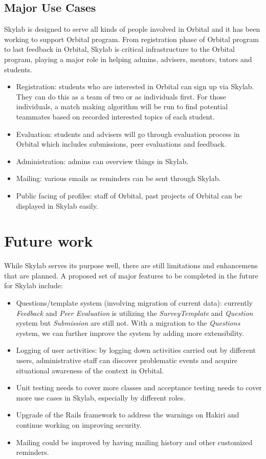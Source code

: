\subsection{Major Use Cases}

Skylab is designed to serve all kinds of people involved in Orbital and it has been working to support Orbital program. From registration phase of Orbital program to last feedback in Orbital, Skylab is critical infrastructure  to the Orbital program, playing a major role in helping admins, advisers, mentors, tutors and students.

\begin{itemize}
  \item Registration: students who are interested in Orbital can sign up via Skylab. They can do this as a team of two or as individuals first. For those individuals, a match making algorithm will be run to find potential teammates based on recorded interested topics of each student.
  \item Evaluation: students and advisers will go through evaluation process in Orbital which includes submissions, peer evaluations and feedback.
  \item Administration: admins can overview things in Skylab.
  \item Mailing: various emails as reminders can be sent through Skylab.
  \item Public facing of profiles: staff of Orbital, past projects of Orbital can be displayed in Skylab easily.
\end{itemize}

\section{Future work}

While Skylab serves its purpose well, there are still limitations and enhancemens that are planned.  A proposed set of major features to be completed in the future for Skylab include:

\begin{itemize}
  \item Questions/template system (involving migration of current data): currently \textit{Feedback} and \textit{Peer Evaluation} is utilizing the \textit{SurveyTemplate} and \textit{Question} system but \textit{Submission} are still not. With a migration to the \textit{Questions} system, we can further improve the system by adding more extensibility.
  \item Logging of user activities: by logging down activities carried out by different users, administrative staff can discover problematic events and acquire situational awareness of the context in Orbital.
  \item Unit testing needs to cover more classes and acceptance testing needs to cover more use cases in Skylab, especially by different roles.
  \item Upgrade of the Rails framework to address the warnings on Hakiri and continue working on improving security.
  \item Mailing could be improved by having mailing history and other customized reminders.
\end{itemize}

